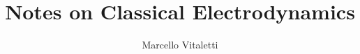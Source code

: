 \documentclass[english, 11pt]{book}
\begin{document}
\newcommand{\quotes}[1]{``#1''}
\newcommand{\sfT}{$\mathsf{T}$}
\newcommand{\udT}{\rotatebox[origin=c]{180}{$\mathsf{T}$}}
\newcommand{\N}{\mathbb{N}}
\newcommand{\Z}{\mathbb{Z}}
\newcommand{\Q}{\mathbb{Q}}
\newcommand{\R}{\mathbb{R}}
\newcommand{\C}{\mathbb{C}}

\author{Marcello Vitaletti}
\title{Notes on Classical Electrodynamics\\
{\small }}
\maketitle

\frontmatter%

%

\tableofcontents
\mainmatter%
	







\end{document}

